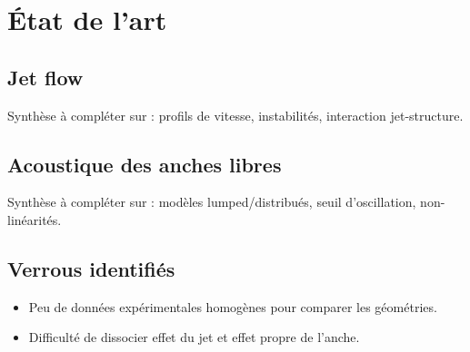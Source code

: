 \chapter{État de l’art}

\section{Jet flow}
Synthèse à compléter sur : profils de vitesse, instabilités, interaction jet-structure.

\section{Acoustique des anches libres}
Synthèse à compléter sur : modèles lumped/distribués, seuil d’oscillation, non-linéarités.

\section{Verrous identifiés}
\begin{itemize}
  \item Peu de données expérimentales homogènes pour comparer les géométries.
  \item Difficulté de dissocier effet du jet et effet propre de l’anche.
\end{itemize}

